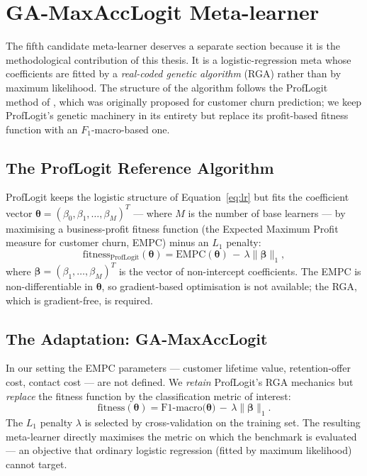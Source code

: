 \section{GA-MaxAccLogit Meta-learner}
\label{sec:gamal}

The fifth candidate meta-learner deserves a separate section because
it is the methodological contribution of this thesis. It is a
logistic-regression meta whose coefficients are fitted by a
\emph{real-coded genetic algorithm} (RGA) rather than by maximum
likelihood. The structure of the algorithm follows the ProfLogit
method of \citet{stripling2018proflogit}, which was originally
proposed for customer churn prediction; we keep ProfLogit's genetic
machinery in its entirety but replace its profit-based fitness
function with an $F_1$-macro-based one.

\subsection{The ProfLogit Reference Algorithm}

ProfLogit keeps the logistic structure of
Equation~\eqref{eq:lr} but fits the coefficient vector
$\boldsymbol{\theta}=(\beta_0,\beta_1,\ldots,\beta_M)^{T}$ ---
where $M$ is the number of base learners --- by maximising a
business-profit fitness function (the Expected Maximum Profit
measure for customer churn, EMPC) minus an $L_1$ penalty:
\begin{equation}
\mathrm{fitness}_{\text{ProfLogit}}(\boldsymbol{\theta})
=
\text{EMPC}(\boldsymbol{\theta})
\,-\,
\lambda\lVert\boldsymbol{\beta}\rVert_{1},
\tag{3.7}
\label{eq:proflogit}
\end{equation}
where $\boldsymbol{\beta}=(\beta_1,\ldots,\beta_M)^{T}$ is the vector
of non-intercept coefficients. The EMPC is non-differentiable in
$\boldsymbol{\theta}$, so gradient-based optimisation is not
available; the RGA, which is gradient-free, is required.

\subsection{The Adaptation: GA-MaxAccLogit}

In our setting the EMPC parameters --- customer lifetime value,
retention-offer cost, contact cost --- are not defined. We
\emph{retain} ProfLogit's RGA mechanics but \emph{replace} the
fitness function by the classification metric of interest:
\begin{equation}
\boxed{\;
\mathrm{fitness}(\boldsymbol{\theta})
=
\text{F1-macro}\bigl(\boldsymbol{\theta}\bigr)
\,-\,
\lambda\lVert\boldsymbol{\beta}\rVert_{1}.
\;}
\tag{3.8}
\label{eq:gamal}
\end{equation}
The $L_1$ penalty $\lambda$ is selected by cross-validation on the
training set. The resulting meta-learner directly maximises the
metric on which the benchmark is evaluated --- an objective that
ordinary logistic regression (fitted by maximum likelihood) cannot
target.

